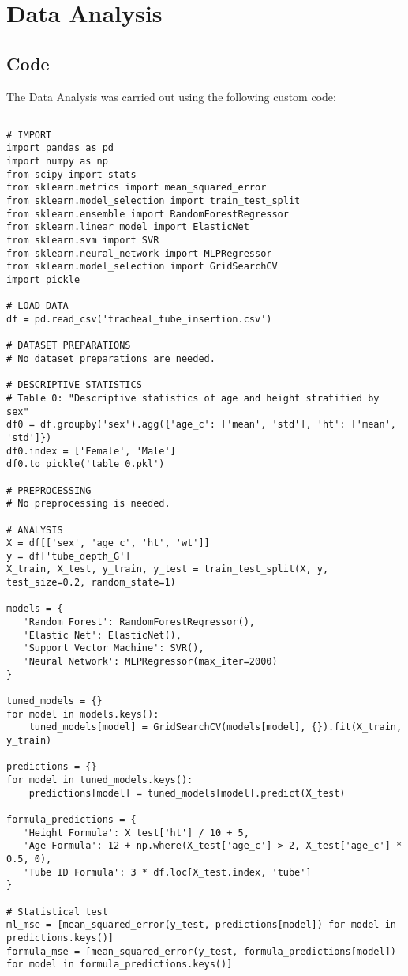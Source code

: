 \documentclass[11pt]{article}
\begin{document}
\section{Data Analysis}
\subsection{{Code}}
The Data Analysis was carried out using the following custom code:

\begin{verbatim}

# IMPORT
import pandas as pd
import numpy as np
from scipy import stats
from sklearn.metrics import mean_squared_error
from sklearn.model_selection import train_test_split
from sklearn.ensemble import RandomForestRegressor
from sklearn.linear_model import ElasticNet
from sklearn.svm import SVR
from sklearn.neural_network import MLPRegressor
from sklearn.model_selection import GridSearchCV
import pickle

# LOAD DATA
df = pd.read_csv('tracheal_tube_insertion.csv')

# DATASET PREPARATIONS
# No dataset preparations are needed.

# DESCRIPTIVE STATISTICS
# Table 0: "Descriptive statistics of age and height stratified by sex"
df0 = df.groupby('sex').agg({'age_c': ['mean', 'std'], 'ht': ['mean', 'std']})
df0.index = ['Female', 'Male']
df0.to_pickle('table_0.pkl')

# PREPROCESSING 
# No preprocessing is needed.

# ANALYSIS
X = df[['sex', 'age_c', 'ht', 'wt']]
y = df['tube_depth_G']
X_train, X_test, y_train, y_test = train_test_split(X, y, test_size=0.2, random_state=1)

models = {
   'Random Forest': RandomForestRegressor(),
   'Elastic Net': ElasticNet(),
   'Support Vector Machine': SVR(),
   'Neural Network': MLPRegressor(max_iter=2000)
}

tuned_models = {}
for model in models.keys():
    tuned_models[model] = GridSearchCV(models[model], {}).fit(X_train, y_train)

predictions = {}
for model in tuned_models.keys():
    predictions[model] = tuned_models[model].predict(X_test)

formula_predictions = {
   'Height Formula': X_test['ht'] / 10 + 5,
   'Age Formula': 12 + np.where(X_test['age_c'] > 2, X_test['age_c'] * 0.5, 0),
   'Tube ID Formula': 3 * df.loc[X_test.index, 'tube']
}

# Statistical test
ml_mse = [mean_squared_error(y_test, predictions[model]) for model in predictions.keys()]
formula_mse = [mean_squared_error(y_test, formula_predictions[model]) for model in formula_predictions.keys()]


\end{verbatim}
\end{document}
